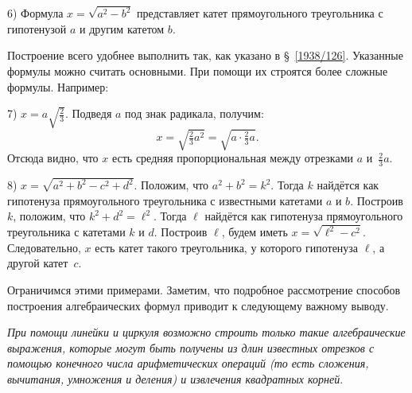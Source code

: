 {6) Формула $x=\sqrt{a^2-b^2}$ представляет катет прямоугольного треугольника с гипотенузой $a$ и другим катетом $b$.

Построение всего удобнее выполнить так, как указано в §~\ref{1938/126}.
Указанные формулы можно считать основными.
При помощи их строятся более сложные формулы.
Например:

7) $x=a\sqrt{\frac23}$.
Подведя $a$ под знак радикала, получим:
\[x=\sqrt{\tfrac23a^2}=\sqrt{a\cdot\tfrac23a}.\]
Отсюда видно, что $x$ есть средняя пропорциональная между отрезками $a$ и~$\tfrac23a$.

8) $x=\sqrt{a^2 + b^2 - c^2 + d^2}$.
Положим, что  $a^2+b^2=k^2$.
Тогда $k$ найдётся как гипотенуза прямоугольного треугольника с известными катетами $a$ и $b$.
Построив $k$, положим, что $k^2+d^2=\ell^2$.
Тогда $\ell$ найдётся как гипотенуза прямоугольного треугольника с катетами $k$ и $d$.
Построив $\ell$, будем иметь $x=\sqrt{\ell^2-c^2}$.
Следовательно, $x$ есть катет такого треугольника, у которого гипотенуза $\ell$, а другой катет~$c$.

Ограничимся этими примерами.
Заметим, что подробное рассмотрение способов построения алгебраических формул приводит к следующему важному выводу.

\emph{При помощи линейки и циркуля возможно строить только такие алгебраические выражения, которые могут быть получены из длин известных отрезков с помощью конечного числа арифметических операций \emph{(то есть сложения, вычитания, умножения и деления)} 
и извлечения квадратных корней}.

}


